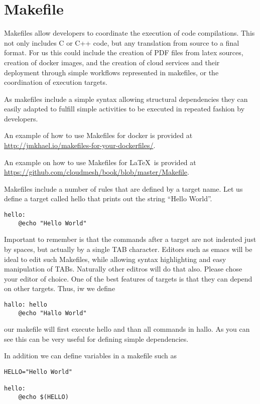 \section{Makefile}
\label{s:makefile}

Makefiles allow developers to coordinate the execution of code
compilations. This not only includes C or C++ code, but any
translation from source to a final format. For us this could include
the creation of PDF files from latex sources, creation of docker
images, and the creation of cloud services and their deployment
through simple workflows represented in makefiles, or the coordination
of execution targets.

As makefiles include a simple syntax allowing structural dependencies
they can easily adapted to fulfill simple activities to be executed in
repeated fashion by developers.

An example of how to use Makefiles for docker is provided at
\url{http://jmkhael.io/makefiles-for-your-dockerfiles/}.

An example on how to use Makefiles for \LaTeX~is provided at
\url{https://github.com/cloudmesh/book/blob/master/Makefile}.

Makefiles include a number of rules that are defined by a target
name. Let us define a target called hello that prints out the string
``Hello World''.

\begin{lstlisting} 
hello:
    @echo "Hello World"
\end{lstlisting} 

Important to remember is that the commands after a target are not
indented just by spaces, but actually by a single TAB
character. Editors such as emacs will be ideal to edit such Makefiles,
while allowing syntax highlighting and easy manipulation of
TABs. Naturally other editros will do that also. Please chose your
editor of choice. One of the best features of targets is that they can
depend on other targets. Thus, iw we define

\begin{lstlisting} 
hallo: hello
    @echo "Hallo World"
\end{lstlisting} 

our makefile will first execute hello and than all commands in hallo.
As you can see this can be very useful for defining simple
dependencies. 

In addition we can define variables in a makefile such as 

\begin{lstlisting} 
HELLO="Hello World"

hello: 
    @echo $(HELLO)
\end{lstlisting} 

